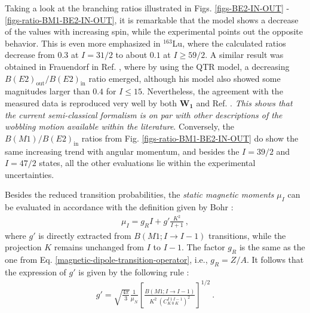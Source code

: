Taking a look at the branching ratios illustrated in Figs. \ref{figs-BE2-IN-OUT} - \ref{figs-ratio-BM1-BE2-IN-OUT}, it is remarkable that the model shows a decrease of the values with increasing spin, while the experimental points out the opposite behavior. This is even more emphasized in $^{163}$Lu, where the calculated ratios decrease from $0.3$ at $I=31/2$ to about $0.1$ at $I\geq 59/2$. A similar result was obtained in Frauendorf in Ref. \cite{frauendorf2014transverse}, where by using the QTR model, a decreasing $B(E2)_\text{out}/B(E2)_\text{in}$ ratio emerged, although his model also showed some magnitudes larger than $0.4$ for $I\leq 15$. Nevertheless, the agreement with the measured data is reproduced very well by both $\mathbf{W_1}$ and Ref. \cite{frauendorf2014transverse}. \emph{This shows that the current semi-classical formalism is on par with other descriptions of the wobbling motion available within the literature}. Conversely, the $B(M1)/B(E2)_\text{in}$ ratios from Fig. \ref{figs-ratio-BM1-BE2-IN-OUT} do show the same increasing trend with angular momentum, and besides the $I=39/2$ and $I=47/2$ states, all the other evaluations lie within the experimental uncertainties.

Besides the reduced transition probabilities, the \emph{static magnetic moments} $\mu_I$ can be evaluated in accordance with the definition given by Bohr \cite{bohr1998nuclear}:
\begin{align}
    \mu_I=g_RI+g'\frac{K^2}{I+1}\ , %
    \label{static-magnetic-moment}
\end{align}
where $g'$ is directly extracted from $B(M1;I\to I-1)$ transitions, while the projection $K$ remains unchanged from $I$ to $I-1$. The factor $g_R$ is the same as the one from Eq. \ref{magnetic-dipole-transition-operator}, i.e., $g_R=Z/A$. It follows that the expression of $g'$ is given by the following rule \cite{bohr1998nuclear}:
\begin{align}
    g'=\sqrt{\frac{4\pi}{3}}\frac{1}{\mu_N}\left[\frac{B(M1;I\to I-1)}{K^2\ \left(C_{K\ 0\ K}^{I\ 1\ I-1}\right)^2}\right]^{1/2}\ .
\end{align}

